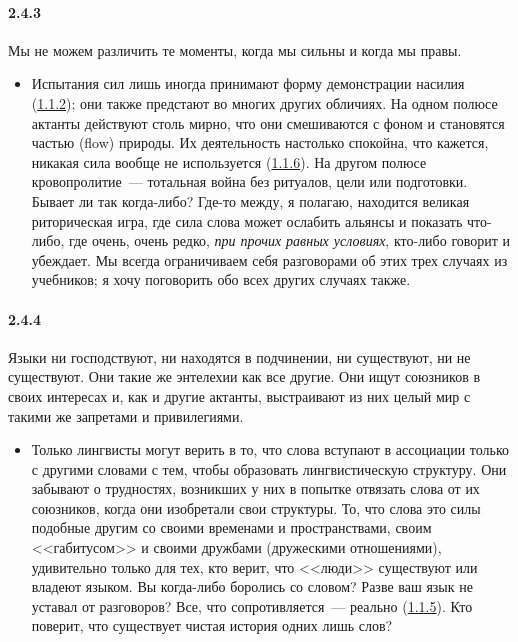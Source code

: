 \paragraph{2.4.3}\hypertarget{par:2.4.3}{} Мы не можем различить те моменты, когда мы сильны и когда мы правы. 
	\begin{itemize}
	\item 
	Испытания сил лишь иногда принимают форму демонстрации насилия (\hyperlink{par:1.1.2}{1.1.2}); они также предстают во многих других обличиях. На одном полюсе актанты действуют столь мирно, что они смешиваются с фоном и становятся частью (flow) природы. Их деятельность настолько спокойна, что кажется, никакая сила вообще не используется (\hyperlink{par:1.1.6}{1.1.6}). На другом полюсе кровопролитие~--- тотальная война без ритуалов, цели или подготовки. Бывает ли так когда-либо? Где-то между, я полагаю, находится великая риторическая игра, где сила слова может ослабить альянсы и показать что-либо, где очень, очень редко, {\itshape при прочих равных условиях}, кто-либо говорит и убеждает. Мы всегда ограничиваем себя разговорами об этих трех случаях из учебников; я хочу поговорить обо всех других случаях также.
	\end{itemize}

\paragraph{2.4.4}\hypertarget{par:2.4.4}{} Языки ни господствуют, ни находятся в подчинении, ни существуют, ни не существуют. Они такие же энтелехии как все другие. Они ищут союзников в своих интересах и, как и другие актанты, выстраивают из них целый мир с такими же запретами и привилегиями.
	\begin{itemize}
	\item 
	Только лингвисты могут верить в то, что слова вступают в ассоциации только с другими словами с тем, чтобы образовать лингвистическую структуру. Они забывают о трудностях, возникших у них в попытке отвязать слова от их союзников, когда они изобретали свои структуры. То, что слова это силы подобные другим со своими временами и пространствами, своим <<габитусом>> и своими дружбами (дружескими отношениями), удивительно только для тех, кто верит, что <<люди>> существуют или владеют языком. Вы когда-либо боролись со словом? Разве ваш язык не уставал от разговоров? Все, что сопротивляется~--- реально (\hyperlink{par:1.1.5}{1.1.5}). Кто поверит, что существует чистая история одних лишь слов?
	\end{itemize}

